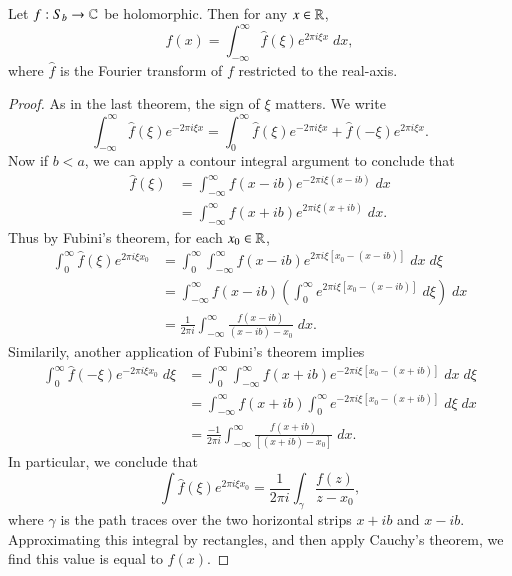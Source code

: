 \begin{theorem}
    Let $f: S_b \to \operatorname{\mathbb{C}}$ be holomorphic. Then for any $x \in \operatorname{\mathbb{R}}$,
    \[ f(x) = \int_{-\infty}^\infty \widehat{f}(\xi) e^{2 \pi i \xi x}\; dx, \]
    where $\widehat{f}$ is the Fourier transform of $f$ restricted to the real-axis.
\end{theorem}
\begin{proof}
    As in the last theorem, the sign of $\xi$ matters. We write
    \[ \int_{-\infty}^\infty \widehat{f}(\xi) e^{-2 \pi i \xi x} = \int_0^\infty \widehat{f}(\xi) e^{- 2 \pi i \xi x} + \widehat{f}(-\xi) e^{2 \pi i \xi x}. \]
    Now if $b < a$, we can apply a contour integral argument to conclude that
    \begin{align*}
        \widehat{f}(\xi) &= \int_{-\infty}^\infty f(x - ib) e^{-2 \pi i \xi (x - ib)}\; dx\\
        &= \int_{-\infty}^\infty f(x + ib) e^{2 \pi i \xi (x + ib)}\; dx.
    \end{align*}
    Thus by Fubini's theorem, for each $x_0 \in \operatorname{\mathbb{R}}$,
    \begin{align*}
        \int_0^\infty \widehat{f}(\xi) e^{2 \pi i \xi x_0} &= \int_0^\infty \int_{-\infty}^\infty f(x - ib) e^{2 \pi i \xi [x_0 - (x - ib)]}\; dx\; d\xi\\
        &= \int_{-\infty}^\infty f(x - ib) \left( \int_0^\infty e^{2 \pi i \xi [x_0 - (x - ib)]}\; d\xi \right)\; dx\\
        &= \frac{1}{2\pi i} \int_{-\infty}^\infty \frac{f(x - ib)}{(x - ib) - x_0}\; dx.
    \end{align*}
    Similarily, another application of Fubini's theorem implies
    \begin{align*}
        \int_0^\infty \widehat{f}(-\xi) e^{-2 \pi i \xi x_0}\; d\xi &= \int_0^\infty \int_{-\infty}^\infty f(x + ib) e^{-2 \pi i \xi [x_0 - (x + ib)]}\; dx\; d\xi\\
        &= \int_{-\infty}^\infty f(x + ib) \int_0^\infty e^{-2 \pi i \xi [x_0 - (x + ib)]}\; d\xi\; dx\\
        &= \frac{-1}{2 \pi i} \int_{-\infty}^\infty \frac{f(x + ib)}{[(x + ib) - x_0]}\; dx.
    \end{align*}
    In particular, we conclude that
    \[ \int \widehat{f}(\xi) e^{2 \pi i \xi x_0} = \frac{1}{2\pi i} \int_\gamma \frac{f(z)}{z - x_0}, \]
    where $\gamma$ is the path traces over the two horizontal strips $x + ib$ and $x - ib$. Approximating this integral by rectangles, and then apply Cauchy's theorem, we find this value is equal to $f(x)$.
\end{proof}

